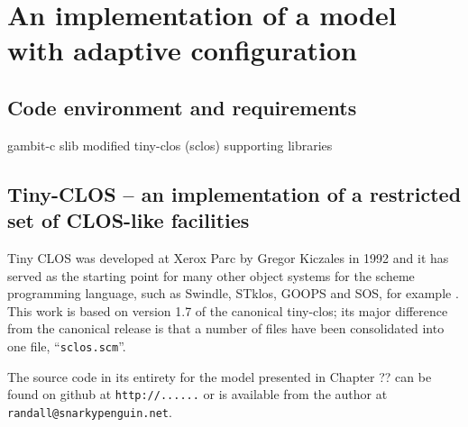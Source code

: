 

\chapter[A MODEL WITH ADAPTIVE CONFIGURATION]{An implementation of a
  model with adaptive configuration}


\section{Code environment and requirements}
gambit-c
slib
modified tiny-clos (sclos)
supporting libraries




    
    



\section{Tiny-CLOS -- an implementation of a restricted set of
  CLOS-like facilities}

Tiny CLOS was developed at Xerox Parc by Gregor Kiczales in 1992
\citep{TinyCLOS} and it has served as the starting point for many
other object systems for the scheme programming language, such as
Swindle, STklos, GOOPS and SOS, for example
\citep{Swindle,STklos,GNU-GOOPS,GNU-SOS}. This work is based on
version 1.7 of the canonical tiny-clos; its major difference from the
canonical release is that a number of files have been consolidated
into one file, ``\texttt{sclos.scm}''. 


The source code in its entirety for the model presented in Chapter ??
can be found on github at \texttt{http://......} or is available from
the author at \texttt{randall@snarkypenguin.net}.


